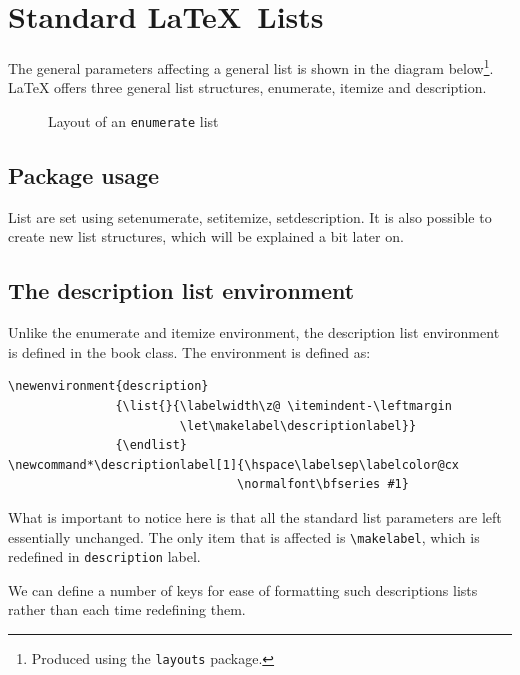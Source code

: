 \chapter{Standard \LaTeX\ Lists}

The general parameters affecting a general list is shown in the  diagram  below\footnote{Produced using the \texttt{layouts} package.}. LaTeX offers three general list structures, enumerate, itemize and description.
\begin{figure}[hp]
\listdiagram
\caption{Layout of an \texttt{enumerate} list} \label{fig:lstenum}
\end{figure}

\section{Package usage}

List are set using setenumerate, setitemize, setdescription. It is also possible to create new list structures, which will be explained a bit later on.

\newpage
\section{The description list environment}
Unlike the enumerate and itemize environment, the description list environment is defined in the book class.
The environment is defined as:

\begin{tcolorbox}
\begin{lstlisting}
\newenvironment{description}
               {\list{}{\labelwidth\z@ \itemindent-\leftmargin
                        \let\makelabel\descriptionlabel}}
               {\endlist}
\newcommand*\descriptionlabel[1]{\hspace\labelsep\labelcolor@cx
                                \normalfont\bfseries #1}
\end{lstlisting}
\end{tcolorbox}

What is important to notice here is that all the standard list parameters are left essentially unchanged. The only item that is affected is \lstinline{\makelabel}, which is redefined in \lstinline{description} label.


We can define a number of keys for ease of formatting such descriptions lists rather than each time redefining them.


